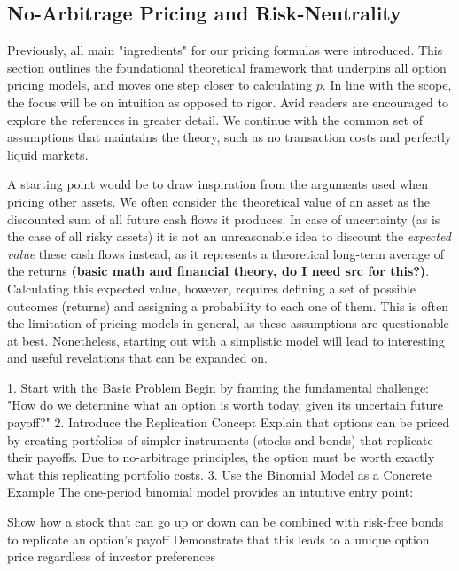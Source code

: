 \documentclass[english,12pt,a4paper,pdftex,sci,utf8]{aaltothesis}
\begin{document}
\subsection{No-Arbitrage Pricing and Risk-Neutrality}
Previously, all main "ingredients" for our pricing formulas were introduced. This section outlines the foundational theoretical framework that underpins all option pricing models, and moves one step closer to calculating $p$. In line with the scope, the focus will be on intuition as opposed to rigor. Avid readers are encouraged to explore the references in greater detail. We continue with the common set of assumptions that maintains the theory, such as no transaction costs and perfectly liquid markets.

A starting point would be to draw inspiration from the arguments used when pricing other assets. We often consider the theoretical value of an asset as the discounted sum of all future cash flows it produces. In case of uncertainty (as is the case of all risky assets) it is not an unreasonable idea to discount the \emph{expected value} these cash flows instead, as it represents a theoretical long-term average of the returns \textbf{(basic math and financial theory, do I need src for this?)}. Calculating this expected value, however, requires defining a set of possible outcomes (returns) and assigning a probability to each one of them. This is often the limitation of pricing models in general, as these assumptions are questionable at best. Nonetheless, starting out with a simplistic model will lead to interesting and useful revelations that can be expanded on. 








1. Start with the Basic Problem
Begin by framing the fundamental challenge: "How do we determine what an option is worth today, given its uncertain future payoff?"
2. Introduce the Replication Concept
Explain that options can be priced by creating portfolios of simpler instruments (stocks and bonds) that replicate their payoffs. Due to no-arbitrage principles, the option must be worth exactly what this replicating portfolio costs.
3. Use the Binomial Model as a Concrete Example
The one-period binomial model provides an intuitive entry point:

Show how a stock that can go up or down can be combined with risk-free bonds to replicate an option's payoff
Demonstrate that this leads to a unique option price regardless of investor preferences
\end{document}
